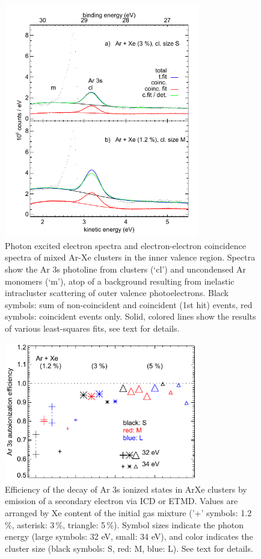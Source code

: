 \begin{figure}[ht]
 \centering
 \includegraphics[width=8.5cm]{pics/figure_ival.pdf}
 \caption{
Photon excited electron spectra and electron-electron coincidence spectra of mixed Ar-Xe clusters in the inner valence region. Spectra show the Ar 3s photoline from clusters (`cl') and uncondensed Ar monomers (`m'), atop of a background resulting from inelastic intracluster scattering of outer valence photoelectrons.\protect\cite{hergenhahn2002} Black symbols: sum of non-coincident and coincident (1st hit) events, red symbols: coincident events only. Solid, colored lines show the results of various least-squares fits, see text for details.
}
 \label{figure:ival}
\end{figure}



\begin{figure}[ht]
 \centering
 \includegraphics[width=8.5cm]{pics/figure_eff.pdf}
 \caption{
Efficiency of the decay of Ar 3s ionized states in ArXe clusters by emission of a secondary electron via ICD or ETMD. Values are arranged by Xe content of the initial gas mixture ('+' symbols: 1.2\,\%, asterisk: 3\,\%, triangle: 5\,\%). Symbol sizes indicate the photon energy (large symbols: 32 eV, small: 34 eV), and color indicates the cluster size (black symbols: S, red: M, blue: L). See text for details.
}
 \label{figure:eff}
\end{figure}
